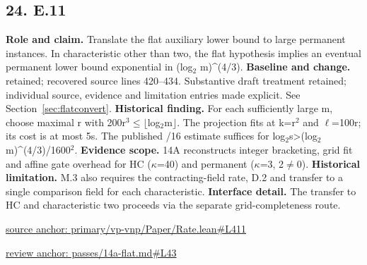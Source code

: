 \documentclass[11pt,letterpaper]{article}
\theoremstyle{definition}\newtheorem{definition}[theorem]{Definition}\newtheorem{example}[theorem]{Example}
\theoremstyle{remark}\newtheorem{remark}[theorem]{Remark}
\begin{document}
\subsection*{24. E.11}
\textbf{Role and claim.} Translate the flat auxiliary lower bound to large permanent instances. In characteristic other than two, the flat hypothesis implies an eventual permanent lower bound exponential in (log\ensuremath{{}_2} m)\textasciicircum{}(4/3).
\textbf{Baseline and change.} retained; recovered source lines 420--434. Substantive draft treatment retained; individual source, evidence and limitation entries made explicit. See Section~\ref{sec:flatconvert}.
\textbf{Historical finding.} For each sufficiently large m, choose maximal r with 200r\ensuremath{{}^3}\ensuremath{\le}\ensuremath{\lfloor}log\ensuremath{{}_2}m\ensuremath{\rfloor}. The projection fits at k=r\ensuremath{{}^2} and \ensuremath{\ell}=100r; its cost is at most 5s. The published /16 estimate suffices for log\ensuremath{{}_2}s>(log\ensuremath{{}_2}m)\textasciicircum{}(4/3)/1600\ensuremath{{}^2}.
\textbf{Evidence scope.} 14A reconstructs integer bracketing, grid fit and affine gate overhead for HC (\ensuremath{\kappa}=40) and permanent (\ensuremath{\kappa}=3, 2\ensuremath{\ne}0).
\textbf{Historical limitation.} M.3 also requires the contracting-field rate, D.2 and transfer to a single comparison field for each characteristic.
\textbf{Interface detail.} The transfer to HC and characteristic two proceeds via the separate grid-completeness route.
\par\href{https://github.com/nousentllc/VP-VNP-Review/blob/8a7976933b6b2b4ffda1ad3a0dfb5fc6b6f023e8/primary/vp-vnp/Paper/Rate.lean\#L411}{source anchor: primary/vp-vnp/Paper/Rate.lean\#L411}
\par\href{https://github.com/nousentllc/VP-VNP-Review/blob/8a7976933b6b2b4ffda1ad3a0dfb5fc6b6f023e8/passes/14a-flat.md\#L43}{review anchor: passes/14a-flat.md\#L43}
\goodbreak
\end{document}
